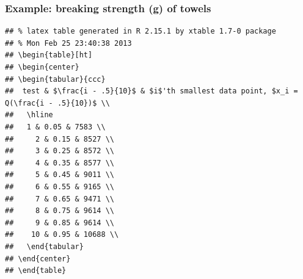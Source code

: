 \documentclass[handout]{beamer}\usepackage{graphicx, color}
\makeatletter
\newenvironment{kframe}{%
 \def\at@end@of@kframe{}%
 \ifinner\ifhmode%
  \def\at@end@of@kframe{\end{minipage}}%
  \begin{minipage}{\columnwidth}%
 \fi\fi%
 \def\FrameCommand##1{\hskip\@totalleftmargin \hskip-\fboxsep
 \colorbox{shadecolor}{##1}\hskip-\fboxsep
     \hskip-\linewidth \hskip-\@totalleftmargin \hskip\columnwidth}%
 \MakeFramed {\advance\hsize-\width
   \@totalleftmargin\z@ \linewidth\hsize
   \@setminipage}}%
 {\par\unskip\endMakeFramed%
 \at@end@of@kframe}
\newenvironment{knitrout}{}{} %
\numberwithin{equation}{section}
\makeatother
\begin{document}
\begin{frame}[fragile]
\frametitle{Example: breaking strength (g) of towels}

\begin{knitrout}
\color{fgcolor}\begin{kframe}
\begin{verbatim}
## % latex table generated in R 2.15.1 by xtable 1.7-0 package
## % Mon Feb 25 23:40:38 2013
## \begin{table}[ht]
## \begin{center}
## \begin{tabular}{ccc}
##  test & $\frac{i - .5}{10}$ & $i$'th smallest data point, $x_i = Q(\frac{i - .5}{10})$ \\ 
##   \hline
##   1 & 0.05 & 7583 \\ 
##     2 & 0.15 & 8527 \\ 
##     3 & 0.25 & 8572 \\ 
##     4 & 0.35 & 8577 \\ 
##     5 & 0.45 & 9011 \\ 
##     6 & 0.55 & 9165 \\ 
##     7 & 0.65 & 9471 \\ 
##     8 & 0.75 & 9614 \\ 
##     9 & 0.85 & 9614 \\ 
##    10 & 0.95 & 10688 \\ 
##   \end{tabular}
## \end{center}
## \end{table}
\end{verbatim}
\end{kframe}
\end{knitrout}


\end{frame}
\end{document}
